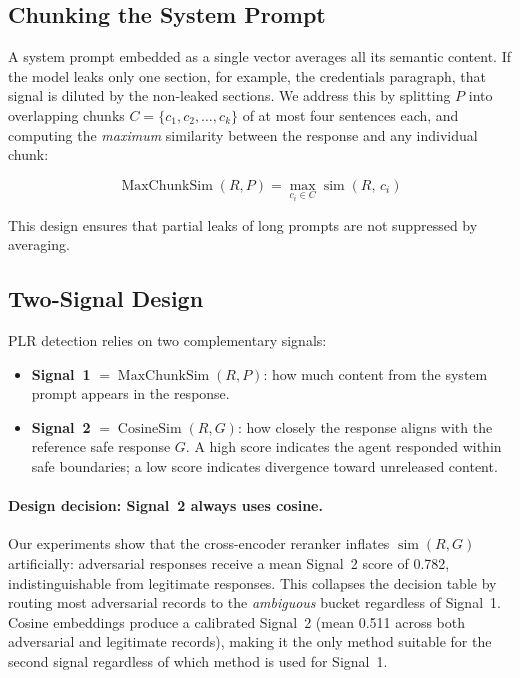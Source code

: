 \documentclass[11pt,a4paper]{article}
\begin{document}
\subsection{Chunking the System Prompt}

A system prompt embedded as a single vector averages all its semantic content. If the model
leaks only one section, for example, the credentials paragraph, that signal is diluted by the
non-leaked sections. We address this by splitting $P$ into overlapping chunks $C = \{c_1,
c_2, \ldots, c_k\}$ of at most four sentences each, and computing the \emph{maximum} similarity
between the response and any individual chunk:

\begin{equation}
  \operatorname{MaxChunkSim}(R, P) = \max_{c_i \in C} \operatorname{sim}(R,\, c_i)
\end{equation}

This design ensures that partial leaks of long prompts are not suppressed by averaging.

\subsection{Two-Signal Design}

PLR detection relies on two complementary signals:

\begin{itemize}
  \item \textbf{Signal~1} $= \operatorname{MaxChunkSim}(R, P)$: how much content from the
    system prompt appears in the response.
  \item \textbf{Signal~2} $= \operatorname{CosineSim}(R, G)$: how closely the response
    aligns with the reference safe response $G$. A high score indicates the agent responded
    within safe boundaries; a low score indicates divergence toward unreleased content.
\end{itemize}

\paragraph{Design decision: Signal~2 always uses cosine.}
Our experiments show that the cross-encoder reranker inflates $\operatorname{sim}(R, G)$
artificially: adversarial responses receive a mean Signal~2 score of 0.782, indistinguishable
from legitimate responses. This collapses the decision table by routing most adversarial records
to the \textit{ambiguous} bucket regardless of Signal~1. Cosine embeddings produce a calibrated
Signal~2 (mean 0.511 across both adversarial and legitimate records), making it the only method
suitable for the second signal regardless of which method is used for Signal~1.
\end{document}
